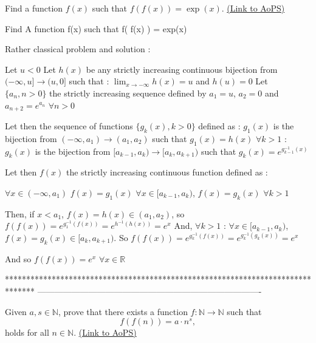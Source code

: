 \begin{problem}
	Find a function $f(x)$ such that $f( f(x) ) = \exp(x)$.
	\flushright \href{https://artofproblemsolving.com/community/c6h172289}{(Link to AoPS)}
\end{problem}



\begin{mysolution}
	\begin{tcolorbox}Find A function f(x) such that f( f(x) ) = exp(x)\end{tcolorbox}

Rather classical problem and solution :

Let $ u < 0$
Let $ h(x)$ be any strictly increasing continuous bijection from $ ( - \infty,u]\rightarrow (u,0]$ such that : $ \lim_{x\rightarrow - \infty}h(x) = u$ and $ h(u) = 0$
Let $ \{a_n,n > 0\}$ the strictly increasing sequence defined by $ a_1 = u$, $ a_2 = 0$ and $ a_{n + 2} = e^{a_n}$ $ \forall n > 0$

Let then the sequence of functions $ \{g_k(x),k > 0\}$ defined as :
$ g_1(x)$ is the bijection from $ ( - \infty,a_1)\rightarrow (a_1,a_2)$ such that $ g_1(x) = h(x)$
$ \forall k > 1$ : 
$ g_k(x)$ is the bijection from $ [a_{k - 1},a_k)\rightarrow [a_k,a_{k + 1})$ such that $ g_k(x) = e^{g_{k - 1}^{ - 1}(x)}$

Let then $ f(x)$ the strictly increasing continuous function defined as :

$ \forall x\in( - \infty,a_1)$ $ f(x) = g_1(x)$
$ \forall x\in[a_{k - 1},a_k)$, $ f(x) = g_k(x)$ $ \forall k > 1$

Then, if $ x < a_1$, $ f(x) = h(x)\in(a_1,a_2)$, so $ f(f(x)) = e^{g_1^{ - 1}(f(x))} = e^{h^{ - 1}(h(x))} = e^x$
And, $ \forall k > 1$ :
$ \forall x\in[a_{k - 1},a_k)$, $ f(x) = g_k(x)\in[a_k,a_{k + 1})$. So $ f(f(x)) = e^{g_{k}^{ - 1}(f(x))} = e^{g_{k}^{ - 1}(g_k(x))} = e^x$

And so $ f(f(x)) = e^x$ $ \forall x\in\mathbb{R}$
\end{mysolution}
*******************************************************************************
-------------------------------------------------------------------------------

\begin{problem}
	Given $a,s \in \mathbb N$, prove that there exists a function $ f: \mathbb N \rightarrow \mathbb N$ such that \[ f(f(n))=  a \cdot n^{s},\] holds for all $ n \in \mathbb N$.
	\flushright \href{https://artofproblemsolving.com/community/c6h172519}{(Link to AoPS)}
\end{problem}



